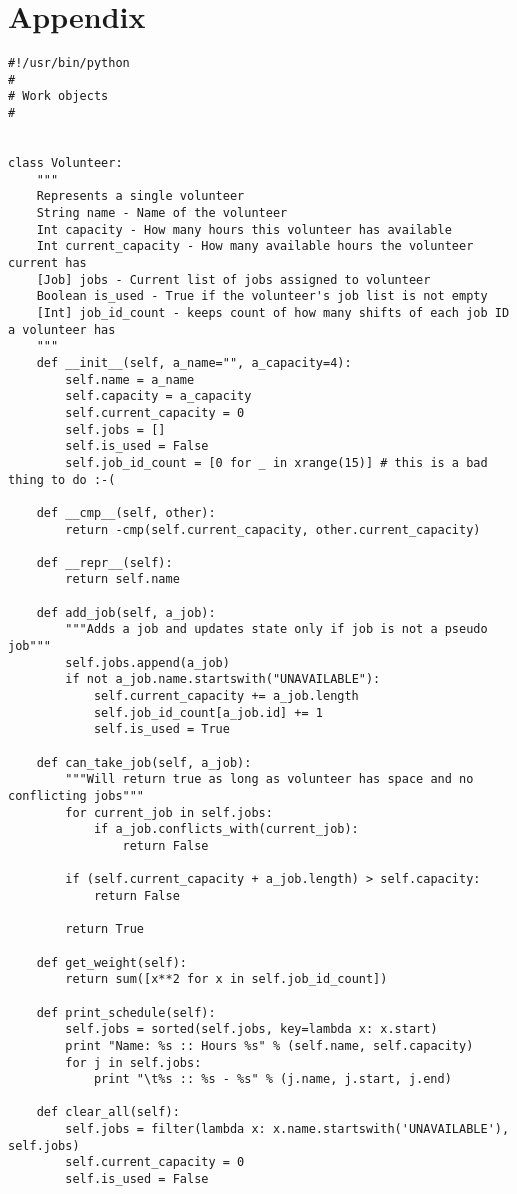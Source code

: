 \documentclass[12pt]{article}
\theoremstyle{definition}
\begin{document}
\section{Appendix}
\begin{lstlisting}
#!/usr/bin/python
#
# Work objects
#


class Volunteer:
    """
    Represents a single volunteer
    String name - Name of the volunteer
    Int capacity - How many hours this volunteer has available
    Int current_capacity - How many available hours the volunteer current has
    [Job] jobs - Current list of jobs assigned to volunteer
    Boolean is_used - True if the volunteer's job list is not empty
    [Int] job_id_count - keeps count of how many shifts of each job ID a volunteer has
    """
    def __init__(self, a_name="", a_capacity=4):
        self.name = a_name
        self.capacity = a_capacity
        self.current_capacity = 0
        self.jobs = []
        self.is_used = False
        self.job_id_count = [0 for _ in xrange(15)] # this is a bad thing to do :-(

    def __cmp__(self, other):
        return -cmp(self.current_capacity, other.current_capacity)

    def __repr__(self):
        return self.name

    def add_job(self, a_job):
        """Adds a job and updates state only if job is not a pseudo job"""
        self.jobs.append(a_job)
        if not a_job.name.startswith("UNAVAILABLE"):
            self.current_capacity += a_job.length
            self.job_id_count[a_job.id] += 1
            self.is_used = True

    def can_take_job(self, a_job):
        """Will return true as long as volunteer has space and no conflicting jobs"""
        for current_job in self.jobs:
            if a_job.conflicts_with(current_job):
                return False

        if (self.current_capacity + a_job.length) > self.capacity:
            return False

        return True

    def get_weight(self):
        return sum([x**2 for x in self.job_id_count])

    def print_schedule(self):
        self.jobs = sorted(self.jobs, key=lambda x: x.start)
        print "Name: %s :: Hours %s" % (self.name, self.capacity)
        for j in self.jobs:
            print "\t%s :: %s - %s" % (j.name, j.start, j.end)

    def clear_all(self):
        self.jobs = filter(lambda x: x.name.startswith('UNAVAILABLE'), self.jobs)
        self.current_capacity = 0
        self.is_used = False



\end{lstlisting}
\end{document}
